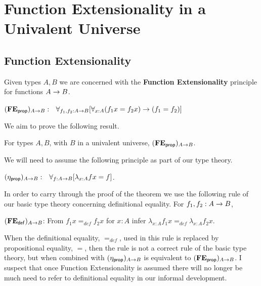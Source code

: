 
\section{Function Extensionality in a Univalent Universe}

\subsection{Function Extensionality}
\begin{defn}
Given types $A,B$ we are concerned with the {\bf Function Extensionality} principle for functions $A\rightarrow B$.
\begin{center}
{\bf $({\bf FE_{\sf prop}})_{A\rightarrow B}:\;\;$} 
  $\forall_{f_1,f_2:A\rightarrow B}[\forall_{x:A}(f_1x=f_2x)\rightarrow (f_1=f_2)]$
\end{center}
\end{defn}
We aim to prove the following result.
\begin{thm}\label{fe:thm}\label{thm:4.2} For types $A,B$, with $B$ in a univalent universe, 
$({\bf FE_{\sf prop}})_{A\rightarrow B}$.
\end{thm}
We will need to assume the following principle as part of our type theory.
\begin{center}
{\bf $({\eta_{\sf prop}})_{A\rightarrow B}:\;\;$} 
  $\forall_{f:A\rightarrow B}[\lambda_{x:A}fx = f]$.
\end{center}

In order to carry through the proof of the theorem we use the following rule of our basic type theory concerning definitional equality.  For $f_1,f_2:A\rightarrow B$,
\begin{center}
$({\bf FE_{\sf def}})_{A\rightarrow B}$: From $f_1x=_{def}f_2x$ for $x:A$ infer $\lambda_{x:A}f_1x =_{def} \lambda_{x:A}f_2x$.
\end{center}
When the definitional equality, $=_{def}$,  used in this rule is replaced by propositional equality, $=$, then the rule is not a correct rule of the basic type theory, but when combined with $({\eta_{\sf prop}})_{A\rightarrow B}$ is equivalent to $({\bf FE_{\sf prop}})_{A\rightarrow B}$.  I suspect that once Function Extensionality is assumed there will no longer be much need to refer to definitional equality in our informal development.


